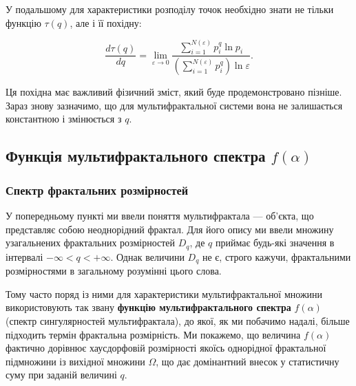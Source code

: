 \documentclass[
  letterpaper,
]{report}
\begin{document}
У подальшому для характеристики розподілу точок необхідно знати не
тільки функцію \(\tau(q)\), але і її похідну:

\[
\frac{d\tau(q)}{dq} = \lim_{\varepsilon\to 0}\frac{\sum_{i=1}^{N(\varepsilon)}p_{i}^{q}\ln{p_{i}}}{\left( \sum_{i=1}^{N(\varepsilon)}p_{i}^{q} \right)\ln{\varepsilon}}.
\]

Ця похідна має важливий фізичний зміст, який буде продемонстровано
пізніше. Зараз знову зазначимо, що для мультифрактальної системи вона не
залишається константною і змінюється з \(q\).

\hypertarget{ux444ux443ux43dux43aux446ux456ux44f-ux43cux443ux43bux44cux442ux438ux444ux440ux430ux43aux442ux430ux43bux44cux43dux43eux433ux43e-ux441ux43fux435ux43aux442ux440ux430-falpha}{%
\subsection{\texorpdfstring{Функція мультифрактального спектра
\(f(\alpha)\)}{Функція мультифрактального спектра f(\textbackslash alpha)}}\label{ux444ux443ux43dux43aux446ux456ux44f-ux43cux443ux43bux44cux442ux438ux444ux440ux430ux43aux442ux430ux43bux44cux43dux43eux433ux43e-ux441ux43fux435ux43aux442ux440ux430-falpha}}

\hypertarget{ux441ux43fux435ux43aux442ux440-ux444ux440ux430ux43aux442ux430ux43bux44cux43dux438ux445-ux440ux43eux437ux43cux456ux440ux43dux43eux441ux442ux435ux439}{%
\subsubsection{Спектр фрактальних
розмірностей}\label{ux441ux43fux435ux43aux442ux440-ux444ux440ux430ux43aux442ux430ux43bux44cux43dux438ux445-ux440ux43eux437ux43cux456ux440ux43dux43eux441ux442ux435ux439}}

У попередньому пункті ми ввели поняття мультифрактала --- об'єкта, що
представляє собою неоднорідний фрактал. Для його опису ми ввели множину
узагальнених фрактальних розмірностей \(D_{q}\), де \(q\) приймає
будь-які значення в інтервалі \(-\infty<q<+\infty\). Однак величини
\(D_{q}\) не є, строго кажучи, фрактальними розмірностями в загальному
розумінні цього слова.

Тому часто поряд із ними для характеристики мультифрактальної множини
використовують так звану \textbf{функцію мультифрактального спектра}
\(f(\alpha)\) (спектр сингулярностей мультифрактала), до якої, як ми
побачимо надалі, більше підходить термін фрактальна розмірність. Ми
покажемо, що величина \(f(\alpha)\) фактично дорівнює хаусдорфовій
розмірності якоїсь однорідної фрактальної підмножини із вихідної множини
\(\Omega\), що дає домінантний внесок у статистичну суму при заданій
величині \(q\).
\end{document}
